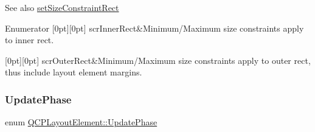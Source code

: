 \begin{DoxySeeAlso}{See also}
\hyperlink{classQCPLayoutElement_a361666cdcc6fbfd37344cc44be746b0f}{set\+Size\+Constraint\+Rect} 
\end{DoxySeeAlso}
\begin{DoxyEnumFields}{Enumerator}
[0pt][0pt]{}\mbox{\label{classQCPLayoutElement_a0afb3e5773529e4bd20e448f81be4d2aa7fa7e25cd23758b9915c64ed9f1be26c}} 
scr\+Inner\+Rect&Minimum/\+Maximum size constraints apply to inner rect. \\
\hline

[0pt][0pt]{}\mbox{\label{classQCPLayoutElement_a0afb3e5773529e4bd20e448f81be4d2aabe2745b41a6131ed194e13591b08e04d}} 
scr\+Outer\+Rect&Minimum/\+Maximum size constraints apply to outer rect, thus include layout element margins. \\
\hline

\end{DoxyEnumFields}
\mbox{\label{classQCPLayoutElement_a0d83360e05735735aaf6d7983c56374d}} 
\subsubsection{\texorpdfstring{Update\+Phase}{UpdatePhase}}
{\footnotesize\ttfamily enum \hyperlink{classQCPLayoutElement_a0d83360e05735735aaf6d7983c56374d}{Q\+C\+P\+Layout\+Element\+::\+Update\+Phase}}

